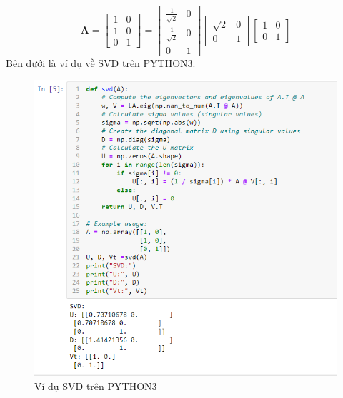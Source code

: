 \documentclass[12pt,a4paper,oneside]{report}
\numberwithin{equation}{section}
\begin{document}
$$
\mathbf{A}=\left[\begin{array}{ll}
	1 & 0 \\
	1 & 0 \\
	0 & 1
\end{array}\right]=\left[\begin{array}{cc}
	\frac{1}{\sqrt{2}} & 0 \\
	\frac{1}{\sqrt{2}} & 0 \\
	0 & 1
\end{array}\right]\left[\begin{array}{cc}
	\sqrt{2} & 0 \\
	0 & 1
\end{array}\right]\left[\begin{array}{ll}
	1 & 0 \\
	0 & 1
\end{array}\right]
$$
Bên dưới là ví dụ về SVD trên PYTHON3.
\begin{figure}[htp]
	\centering
	\includegraphics[scale=0.9]{example_svd.png}
	\caption{Ví dụ SVD trên PYTHON3}
	\label{fig:galaxy}
\end{figure}
\end{document}
